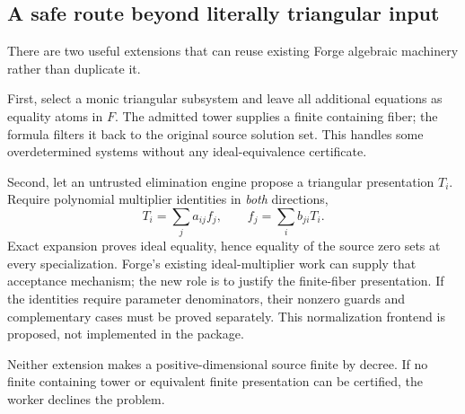 \subsection{A safe route beyond literally triangular input}

There are two useful extensions that can reuse existing Forge algebraic machinery rather than duplicate it.

First, select a monic triangular subsystem and leave all additional equations as equality atoms in $F$. The admitted tower supplies a finite containing fiber; the formula filters it back to the original source solution set. This handles some overdetermined systems without any ideal-equivalence certificate.

Second, let an untrusted elimination engine propose a triangular presentation $T_i$. Require polynomial multiplier identities in \emph{both} directions,
\[
T_i=\sum_j a_{ij}f_j,\qquad f_j=\sum_i b_{ji}T_i.
\]
Exact expansion proves ideal equality, hence equality of the source zero sets at every specialization. Forge's existing ideal-multiplier work can supply that acceptance mechanism; the new role is to justify the finite-fiber presentation. If the identities require parameter denominators, their nonzero guards and complementary cases must be proved separately. This normalization frontend is proposed, not implemented in the package.

Neither extension makes a positive-dimensional source finite by decree. If no finite containing tower or equivalent finite presentation can be certified, the worker declines the problem.
